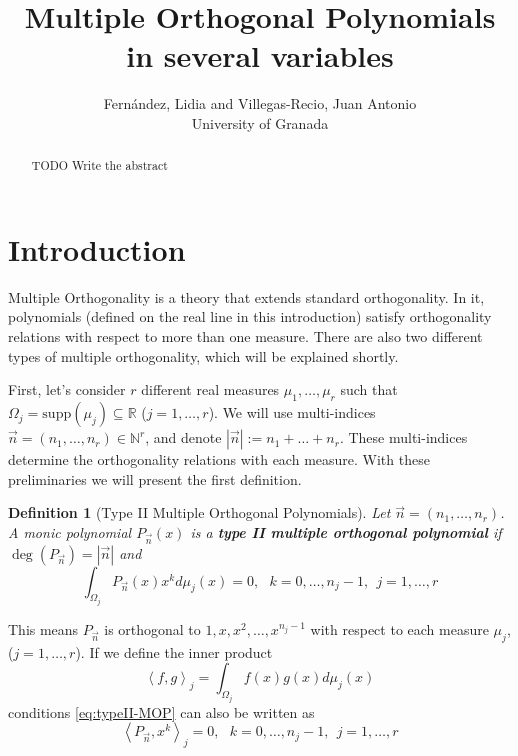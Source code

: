 \documentclass[12pt,a4]{article}
\theoremstyle{plain}
\newtheorem{definition}[theorem]{Definition}
\newcommand{\R}[0]{\mathbb{R}}
\newcommand{\N}[0]{\mathbb{N}}
\newcommand{\supp}[0]{\mathrm{supp}}
\newcommand{\cred}[1]{{\color{red} #1}}
\newcommand{\prodesc}[2]{\left\langle #1 , #2 \right\rangle}
\begin{document}
\title{Multiple Orthogonal Polynomials in several variables}


\author{Fernández, Lidia and Villegas-Recio, Juan Antonio\\
\small University of Granada}
\maketitle

\begin{abstract}
\cred{TODO Write the abstract}
\end{abstract}

\section{Introduction}

Multiple Orthogonality is a theory that extends standard orthogonality. In it, polynomials (defined on the real line in this introduction) satisfy orthogonality relations with respect to more than one measure. There are also two different types of multiple orthogonality, which will be explained shortly.

First, let's consider $r$ different real measures $\mu_1,\dots,\mu_r$ such that $\Omega_j=\supp(\mu_j)\subseteq\R$ ($j=1,\dots,r$). We will use multi-indices $\vec n = (n_1, \dots,n_r)\in \N^r$, and denote $|\vec n| := n_1 + \dots + n_r$. These multi-indices determine the orthogonality relations with each measure. With these preliminaries we will present the first definition.

\begin{definition}[Type II Multiple Orthogonal Polynomials]
    Let $\vec n = (n_1,\dots,n_r)$. A monic polynomial $P_{\vec n}(x)$ is a \textbf{type II multiple orthogonal polynomial} if $\deg(P_{\vec n})= |\vec n|$ and 
    \begin{equation}
        \label{eq:typeII-MOP}
        \int_{\Omega_j} P_{\vec n}(x) x^k d\mu_j(x) = 0, \ \ \ k=0,\dots,n_{j}-1, \ \ j = 1,\dots,r
    \end{equation}
\end{definition}

This means $P_{\vec n}$ is orthogonal to $1,x,x^2,\dots,x^{n_j-1}$ with respect to each measure $\mu_j$, ($j=1,\dots,r$). If we define the inner product 
\begin{equation}
    \label{eq:inner-product}
    \prodesc{f}{g}_j=\int_{\Omega_j}f(x)g(x)d\mu_j(x)
\end{equation}
conditions \eqref{eq:typeII-MOP} can also be written as
\begin{equation}
    \label{eq:typeII-MOP-dot}
    \prodesc{P_{\vec n}}{x^k}_j = 0, \ \ \ k=0,\dots,n_{j}-1, \ \ j = 1,\dots,r
\end{equation}
\end{document}
